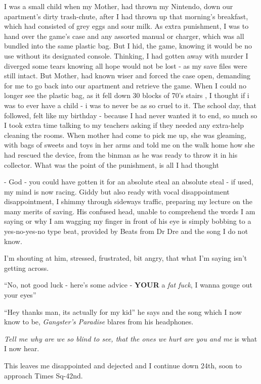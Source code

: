 \documentclass[19pt,openany]{book}
\begin{document}
I was a small child
when my Mother, had thrown my Nintendo,
down our apartment's dirty trash-chute, after
I had thrown up that morning's breakfast,
which had consisted of grey eggs and sour
milk. As extra punishment, I was
to hand over the game's case
and any assorted manual or charger,
which was all bundled into the
same plastic bag. But I hid, the
game, knowing it would be no use
without its designated console. Thinking,
I had gotten away with murder I diverged
some tears knowing all hope would not be
lost - as my save files were still intact.
But Mother, had known wiser and forced
the case open, demanding for me to go back
into our apartment and retrieve the game.
When I could no longer see the plastic bag,
as it fell down 30 blocks of 70's stairs
, I thought if i was to ever
have a child - i was to never be as so cruel
to it. The school day, that followed,
felt like my birthday - because I had never
wanted it to end, so much so I took extra
time talking to my teachers asking if
they needed any extra-help cleaning the rooms.
When mother had come to pick me up,
she was gleaming, with bags of sweets and
toys in her arms and told me on the walk
home how she had rescued the device, from
the binman as he was ready to throw it in his
collector. What was the point of the punishment,
is all I had thought

- God - you
could have gotten it for
an absolute steal
an absolute steal - if used,
my mind is now racing.
Giddy but also ready with vocal disappointment
disappointment, I shimmy through sideways
traffic, preparing my lecture on the many
merits of
saving. His confused head, unable
to comprehend the words I
am saying or why I am
wagging my finger in front of his
eye is simply bobbing to a yes-no-yes-no
type beat, provided by Beats from Dr Dre and
the song I do not know.

I'm shouting at him, stressed,
frustrated, bit angry, that what
I'm saying isn't getting across.

``No, not good luck - here's some
advice - \textbf{YOUR} a \textit{fat fuck}, I wanna
gouge out your eyes''

``Hey thanks man, its actually
for my kid'' he says
and
the song which I now know
to be, \textit{Gangster's Paradise}
blares
from his headphones.

\textit{Tell me why are we so
blind to see, that the
ones we hurt are you and me}
is what I now hear.

This leaves me disappointed
and dejected and I continue
down 24th, soon to approach
Times Sq-42nd.
\end{document}
